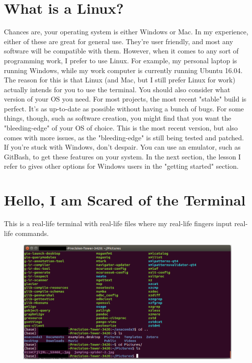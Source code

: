 \documentclass[letterpaper]{article}
\begin{document}
\section{What is a Linux?}

Chances are, your operating system is either Windows or Mac.  In my experience, either of these are great for general use.  They're user friendly, and most any software will be compatible with them.  However, when it comes to any sort of programming work, I prefer to use Linux.  For example, my personal laptop is running Windows, while my work computer is currently running Ubuntu 16.04.  The reason for this is that Linux (and Mac, but I still prefer Linux for work) actually intends for you to use the terminal.  You should also consider what version of your OS you need.  For most projects, the most recent "stable" build is perfect.  It's as up-to-date as possible without having a bunch of bugs.  For some things, though, such as software creation, you might find that you want the "bleeding-edge" of your OS of choice.  This is the most recent version, but also comes with more issues, as the "bleeding-edge" is still being tested and patched.\\

If you're stuck with Windows, don't despair.  You can use an emulator, such as GitBash, to get these features on your system.  In the next section, the lesson I refer to gives other options for Windows users in the "getting started" section.

\section{Hello, I am Scared of the Terminal}

This is a real-life terminal with real-life files where my real-life fingers input real-life commands.
\begin{figure}[H]
  \centering
  \includegraphics[width=1.0\linewidth]{wowterminal.png}
  \label{fig:fig1}
\end{figure}
\end{document}
